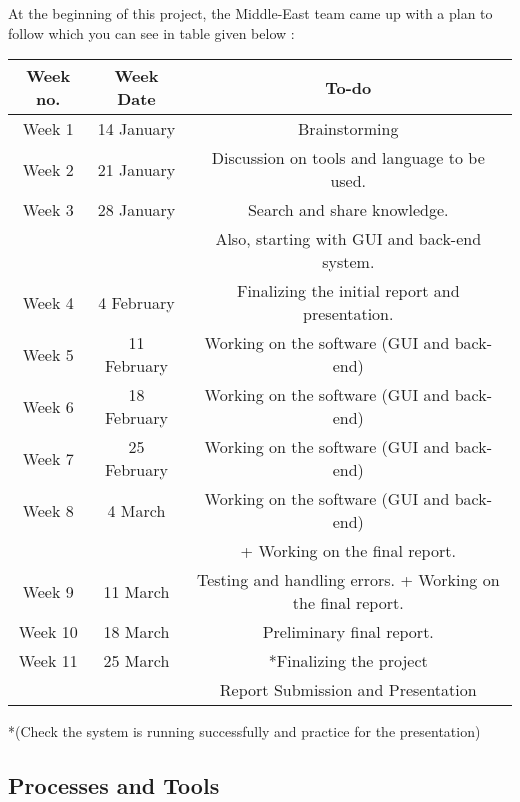 \documentclass{article}
\begin{document}
At the beginning of this project, the Middle-East team came up with a plan to follow which you can see in table given below : 
\newline
\begin{center}
\begin{tabular}{|c|c|c|} 

\hline
\textbf{Week no.} & \textbf{Week Date } & \textbf{To-do } \\ 
\hline
Week 1 & 14 January  & Brainstorming \\ 
\hline
Week 2 & 21 January  & Discussion  on tools and language to be used. \\ 
\hline

Week 3 & 28 January & Search and share knowledge. \\
 & & Also, starting with GUI and back-end system. 
 \\ 
\hline
Week 4 & 4 February & Finalizing the initial report and presentation.  \\ 
\hline
Week 5 &  11 February & Working on the software (GUI and back-end)  \\
\hline
Week 6 & 18  February & Working on the software (GUI and back-end)   \\ 
\hline
Week 7 & 25  February & Working on the software (GUI and back-end)   \\ 
\hline
Week 8 & 4 March  & Working on the software (GUI and back-end)   \\  
 & & + Working on the final report. \\   
\hline
Week 9 & 11 March  & Testing and handling errors. + Working on the final report.   \\ 
\hline
Week 10 & 18 March  & Preliminary final report. \\ 
\hline
Week 11 & 25 March  & *Finalizing the project  \\ 
 &  & Report Submission and Presentation  \\

\hline

\end{tabular}
\end{center}
    



*(Check the system is running successfully and practice for the presentation) 
 


\subsection{Processes and Tools}
\end{document}
